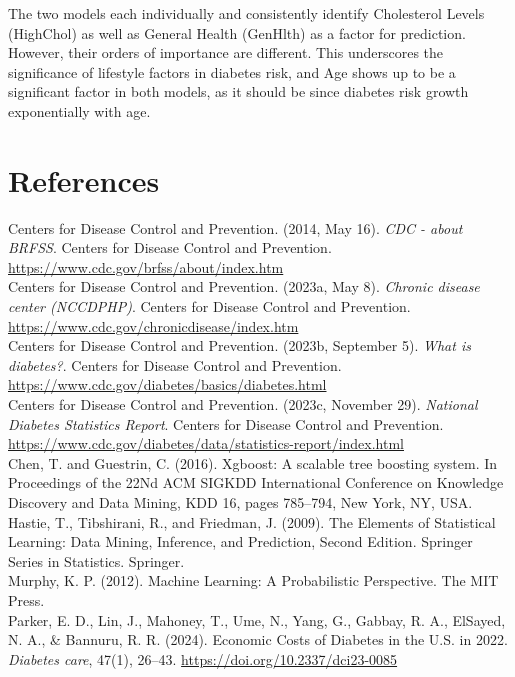 \documentclass[12pt]{article}
\begin{document}
The two models each individually and consistently identify Cholesterol Levels (HighChol) as well as General Health (GenHlth) as a factor for prediction. However, their orders of importance are different. This underscores the significance of lifestyle factors in diabetes risk, and Age shows up to be a significant factor in both models, as it should be since diabetes risk growth exponentially with age.
\pagebreak

\section{References}
\begin{hangparas}{.25in}{1}
Centers for Disease Control and Prevention. (2014, May 16). \textit{CDC - about BRFSS}. Centers for Disease Control and Prevention. \url{https://www.cdc.gov/brfss/about/index.htm} \\

Centers for Disease Control and Prevention. (2023a, May 8). \textit{Chronic disease center (NCCDPHP)}. Centers for Disease Control and Prevention. \url{https://www.cdc.gov/chronicdisease/index.htm} \\

Centers for Disease Control and Prevention. (2023b, September 5). \textit{What is diabetes?}. Centers for Disease Control and Prevention. \url{https://www.cdc.gov/diabetes/basics/diabetes.html} \\

Centers for Disease Control and Prevention. (2023c, November 29). \textit{National Diabetes Statistics Report}. Centers for Disease Control and Prevention. \url{https://www.cdc.gov/diabetes/data/statistics-report/index.html} \\

Chen, T. and Guestrin, C. (2016). Xgboost: A scalable tree boosting system. In Proceedings of the 22Nd ACM SIGKDD International Conference on Knowledge Discovery and Data Mining, KDD 16, pages 785–794, New York, NY, USA. \\

Hastie, T., Tibshirani, R., and Friedman, J. (2009). The Elements of Statistical Learning: Data Mining, Inference, and Prediction, Second Edition. Springer Series in Statistics. Springer. \\

Murphy, K. P. (2012). Machine Learning: A Probabilistic Perspective. The MIT Press. \\

Parker, E. D., Lin, J., Mahoney, T., Ume, N., Yang, G., Gabbay, R. A., ElSayed, N. A., \& Bannuru, R. R. (2024). Economic Costs of Diabetes in the U.S. in 2022. \textit{Diabetes care}, 47(1), 26–43. \url{https://doi.org/10.2337/dci23-0085} \\
\end{hangparas}
\end{document}
